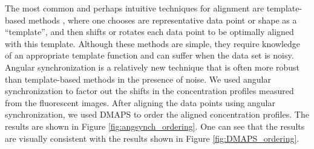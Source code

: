 \documentclass[10pt]{article}
\begin{document}
The most common and perhaps intuitive techniques for alignment are template-based methods \cite{ahuja2007template}, where one chooses are representative data point or shape as a ``template'', and then shifts or rotates each data point to be optimally aligned with this template.
%
Although these methods are simple, they require knowledge of an appropriate template function and can suffer when the data set is noisy.
%
Angular synchronization \cite{singer2011angular} is a relatively new technique that is often more robust than template-based methods in the presence of noise.
%
We used angular synchronization to factor out the shifts in the concentration profiles measured from the fluorescent images.
%
After aligning the data points using angular synchronization, we used DMAPS to order the aligned concentration profiles.
%
The results are shown in Figure \ref{fig:angsynch_ordering}.
%
One can see that the results are visually consistent with the results shown in Figure \ref{fig:DMAPS_ordering}. 
\end{document}
